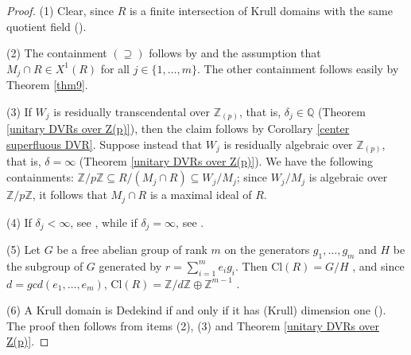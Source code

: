 \documentclass[10pt]{article}
\numberwithin{equation}{section}
\theoremstyle{definition}
\newtheorem{Rem}[equation]{Remark}
\theoremstyle{definition}
\newcommand{\Q}{\mathbb{Q}}
\newcommand{\Z}{\mathbb{Z}}
\newcommand{\oQp}{\overline{\Q_p}}
\newcommand\rc { \color{red}}
\newcommand\bc { \color{blue}}
\begin{document}
\begin{proof}
(1) Clear, since $R$ is a finite intersection of Krull domains with the same quotient field (\cite[Chapter VII, \S 1, 3. Exemples, 3)]{Bourb}).

(2) The containment $(\supseteq)$ follows by \cite[Corollary 2.3(3)]{Chang}
and the assumption that $M_j\cap R\in X^1(R)$ for all $j\in\{1,\ldots,m\}$.
The other containment follows easily by  Theorem  \ref{thm9}.

(3) If $W_j$ is residually transcendental over $\Z_{(p)}$, that is, $\delta_j\in\Q$ (Theorem \ref{unitary DVRs over Z(p)}), then the claim follows by Corollary \ref{center superfluous DVR}. Suppose instead that $W_j$ is residually algebraic over $\Z_{(p)}$, that is, $\delta=\infty$ (Theorem \ref{unitary DVRs over Z(p)}).  We have the following containments: $\Z/p\Z\subseteq R/(M_j\cap R)\subseteq W_j/M_j$; since $W_j/M_j$ is algebraic over $\Z/p\Z$, it follows that $M_j\cap R$ is a maximal ideal of $R$.

(4) If $\delta_j<\infty$, see \cite[Theorem 2.1, c)]{APZTheorem}, while if $\delta_j=\infty$, see \cite[Proposition 2.2]{PerTransc}.

(5) Let $G$ be a free abelian group of rank $m$ on the generators $g_1, \dots, g_m$
and $H$ be the subgroup of $G$ generated by $r = \sum\limits_{i=1}^me_ig_i$. Then Cl$(R) = G/H$ \cite[Theorem 2.4]{Chang},
and since $d= gcd(e_1, \dots , e_m)$, Cl$(R) = \Z/d\Z \oplus \Z^{m-1}$
\cite[Remark 1.6]{Chang}.


(6) A Krull domain is Dedekind if and only if it has (Krull) dimension one (\cite[ Theorem 28, Chapt. VI, \S 13]{ZS2}). The proof then follows from items (2), (3) and Theorem \ref{unitary DVRs over Z(p)}.
\end{proof}

\end{document}
